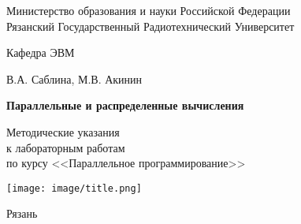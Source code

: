 
\begin{titlepage}

\begin{center}

Министерство образования и науки Российской Федерации \\
Рязанский Государственный Радиотехнический Университет

\bigskip

Кафедра ЭВМ

\vspace{5em}

В.А. Саблина, М.В. Акинин

\vspace{3em}

{\Large \bf Параллельные и распределенные вычисления}

\vspace{3em}

Методические указания\\
к лабораторным работам\\
по курсу <<Параллельное программирование>>

\vfill

\texttt{[image: image/title.png]}

\vfill

Рязань \the\year

\end{center}

\thispagestyle{empty}

\end{titlepage}

\setcounter{page}{2}

\newpage

